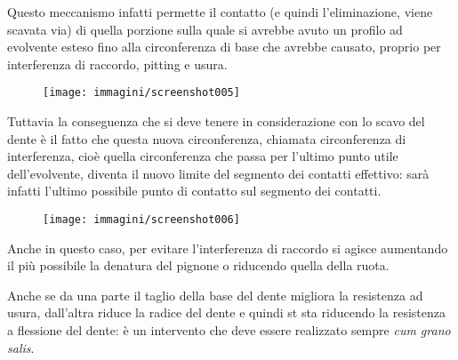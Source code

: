 \documentclass[a4paper, 15pt]{article}
\begin{document}
\begin{adjustwidth}{2in}{}
		Questo meccanismo infatti permette il contatto (e quindi l'eliminazione, viene scavata via) di quella porzione sulla quale si avrebbe avuto un profilo ad evolvente esteso fino alla circonferenza di base che avrebbe causato, proprio per interferenza di raccordo, pitting e usura.
		\begin{figure}[H]
			\centering
			\texttt{[image: immagini/screenshot005]}
			\label{fig:screenshot005}
		\end{figure}				
		Tuttavia la conseguenza che si deve tenere in considerazione con lo scavo del dente è il fatto che questa nuova circonferenza, chiamata circonferenza di interferenza, cioè quella circonferenza che passa per l'ultimo punto utile dell'evolvente, diventa il nuovo limite del segmento dei contatti effettivo: sarà infatti l'ultimo possibile punto di contatto sul segmento dei contatti. 
		\begin{figure}[H]
			\centering
			\texttt{[image: immagini/screenshot006]}
			\label{fig:screenshot006}
		\end{figure}		
		Anche in questo caso, per evitare l'interferenza di raccordo si agisce aumentando il più possibile la denatura del pignone o riducendo quella della ruota. 
		
		Anche se da una parte il taglio della base del dente migliora la resistenza ad usura, dall'altra riduce la radice del dente e quindi st sta riducendo la resistenza a flessione del dente: è un intervento che deve essere realizzato sempre \textit{cum grano salis}. 
\end{adjustwidth}
\end{document}

